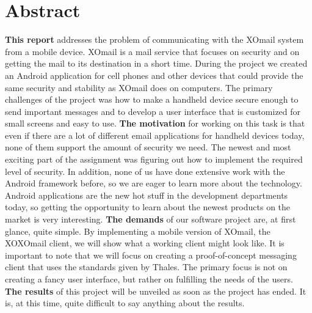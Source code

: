 
\chapter*{Abstract}

\textbf{This report} addresses the problem of communicating with the XOmail system from a mobile device. XOmail is a mail service that focuses on security and on getting the mail to its destination in a short time. During the project we created an Android application for cell phones and other devices that could provide the same security and stability as XOmail does on computers. The primary challenges of the project was how to make a handheld device secure enough to send important messages and to develop a user interface that is customized for small screens and easy to use. 
\newline
\newline
\textbf{The motivation} for working on this task is that even if there are a lot of different email applications for handheld devices today, none of them support the amount of security we need. The newest and most exciting part of the assignment was figuring out how to implement the required level of security. In addition, none of us have done extensive work with the Android framework before, so we are eager to learn more about the technology. Android applications are the new hot stuff in the development departments today, so getting the opportunity to learn about the newest products on the market is very interesting. 
\newline
\newline
\textbf{The demands} of our software project are, at first glance, quite simple. By implementing a mobile version of XOmail, the XOXOmail client, we will show what a working client might look like. It is important to note that we will focus on creating a proof-of-concept messaging client that uses the standards given by Thales. The primary focus is not on creating a fancy user interface, but rather on fulfilling the needs of the users. 
\newline
\newline
\textbf{The results} of this project will be unveiled as soon as the project has ended. It is, at this time, quite difficult to say anything about the results.

